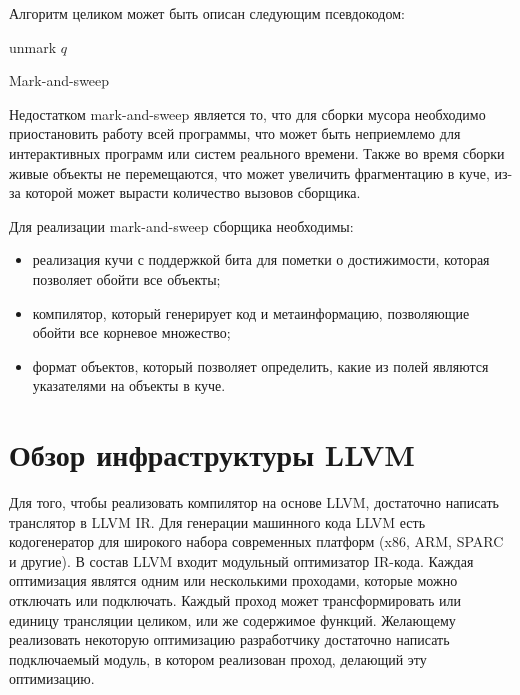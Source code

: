 Алгоритм целиком может быть описан следующим псевдокодом: 
\begin{algorithm}
\begin{algorithmic}[1]

    \State {}
  \EndFor
  \State {}
\EndFunction

    \State \Return
  \EndIf
    \State {}
  \EndFor
\EndFunction

    \Else
        \State unmark $q$
    \EndIf
  \EndFor
\EndFunction

\end{algorithmic}
\caption{Mark-and-sweep}
\end{algorithm}

Недостатком mark-and-sweep является то, что для сборки мусора необходимо приостановить работу всей программы, что может быть неприемлемо для интерактивных программ или систем реального времени. Также во время сборки живые объекты не перемещаются, что может увеличить фрагментацию в куче, из-за которой может вырасти количество вызовов сборщика. 

Для реализации mark-and-sweep сборщика необходимы:
\begin{itemize}
  \item реализация кучи с поддержкой бита для пометки о достижимости, которая позволяет обойти все объекты;
  \item компилятор, который генерирует код и метаинформацию, позволяющие обойти все корневое множество;
  \item формат объектов, который позволяет определить, какие из полей являются указателями на объекты в куче.
\end{itemize}

\section{Обзор инфраструктуры LLVM}
Для того, чтобы реализовать компилятор на основе LLVM, достаточно написать транслятор в LLVM IR. Для генерации машинного кода LLVM есть кодогенератор для широкого набора современных платформ (x86, ARM, SPARC и другие). В состав LLVM входит модульный оптимизатор IR-кода. Каждая оптимизация являтся одним или несколькими проходами, которые можно отключать или подключать. Каждый проход может трансформировать или единицу трансляции целиком, или же содержимое функций. Желающему реализовать некоторую оптимизацию разработчику достаточно написать подключаемый модуль, в котором реализован проход, делающий эту оптимизацию. 

